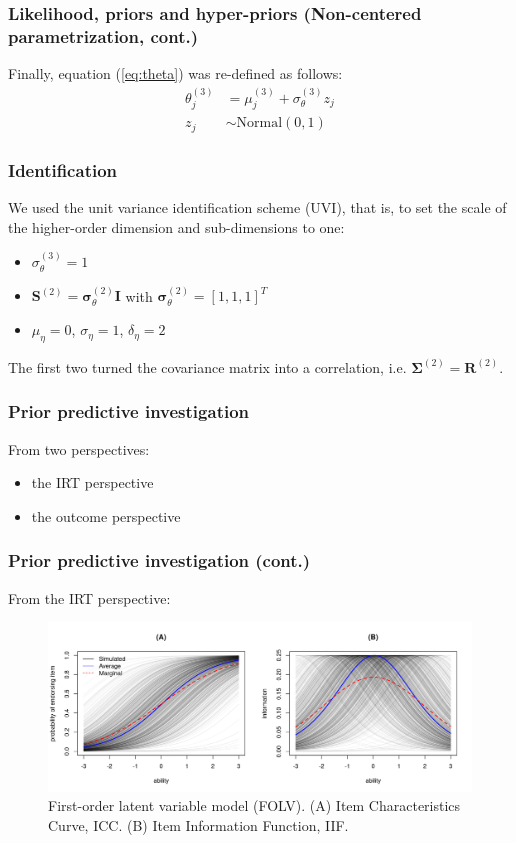 \documentclass[arial,12pt,xcolor=dvipsnames]{beamer}
\begin{document}
%
\begin{frame}
	\frametitle{Likelihood, priors and hyper-priors
		(Non-centered parametrization, cont.)}
	Finally, equation (\ref{eq:theta}) was re-defined as follows:
	\begin{align}
		\theta^{(3)}_{j} &= \mu^{(3)}_{j} + \sigma^{(3)}_{\theta} z_{j} \\
		z_{j} &\sim \text{Normal}(0,1)
	\end{align}
\end{frame}
%
\begin{frame}
	\frametitle{Identification}
	We used the unit variance identification scheme (UVI), that is, to set the scale of the higher-order dimension and sub-dimensions to one:
	\begin{itemize}
		\item $\sigma^{(3)}_{\theta} = 1$
		\item $\mathbf{S}^{(2)} = \pmb{\sigma}^{(2)}_{\theta} \mathbf{I}$ with $\pmb{\sigma}^{(2)}_{\theta} = [1, 1, 1]^{T}$
		\item $\mu_{\eta} = 0$, $\sigma_{\eta}=1$, $\delta_{\eta}=2$
	\end{itemize}
	The first two turned the covariance matrix into a correlation, i.e. $\boldsymbol{\Sigma}^{(2)} = \boldsymbol{R}^{(2)}$.
\end{frame}
%
\begin{frame}
	\frametitle{Prior predictive investigation}
	From two perspectives:
	\begin{itemize}
		\item the IRT perspective
		\item the outcome perspective
	\end{itemize}
\end{frame}
%
\begin{frame}
	\frametitle{Prior predictive investigation (cont.)}
	From the IRT perspective:
	\begin{figure}[H]
		\centering
		\includegraphics[width=1\linewidth]{FOLV_ICC_prior}
		\caption{First-order latent variable model (FOLV). (A) Item Characteristics Curve, ICC. (B) Item Information Function, IIF.}
		\label{fig:FOLV_ICC_prior}
	\end{figure} 
\end{frame}
\end{document}
